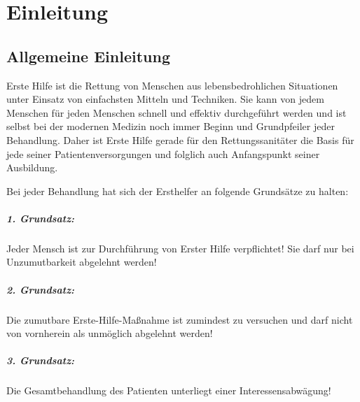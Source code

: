 \section{Einleitung}



\subsection{Allgemeine Einleitung}


Erste Hilfe ist die Rettung von Menschen aus lebensbedrohlichen
Situationen unter Einsatz von einfachsten Mitteln und Techniken. Sie
kann von jedem Menschen für jeden Menschen schnell und effektiv
durchgeführt werden und ist selbst bei der modernen Medizin noch
immer Beginn und Grundpfeiler jeder Behandlung. Daher ist Erste Hilfe gerade
für den Rettungssanitäter die Basis für jede seiner 
Patientenversorgungen und folglich auch Anfangspunkt seiner
Ausbildung.



Bei jeder Behandlung hat sich der Ersthelfer an folgende Grundsätze zu halten:

\subparagraph{1. Grundsatz:} Jeder Mensch ist zur Durchführung von Erster Hilfe
verpflichtet! Sie darf nur bei Unzumutbarkeit abgelehnt werden!


\subparagraph{2. Grundsatz:} Die zumutbare Erste-Hilfe-Maßnahme ist zumindest zu
versuchen und darf nicht von vornherein als unmöglich abgelehnt werden!


\subparagraph{3. Grundsatz:} Die Gesamtbehandlung des Patienten unterliegt einer
Interessensabwägung!

